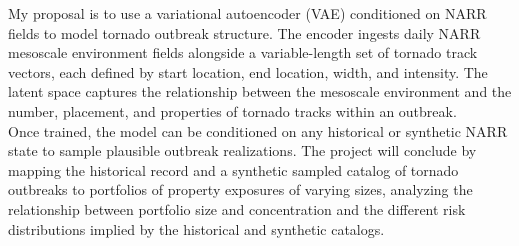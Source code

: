 \documentclass{article}
\begin{document}
My proposal is to use a variational autoencoder (VAE) conditioned on NARR fields to model tornado outbreak structure. The encoder ingests daily NARR mesoscale environment fields alongside a variable-length set of tornado track vectors, each defined by start location, end location, width, and intensity. The latent space captures
  the relationship between the mesoscale environment and the number, placement, and properties of tornado tracks within an outbreak. \\
  
  Once trained, the model can
  be conditioned on any historical or synthetic NARR state to sample plausible outbreak realizations. The project will conclude by mapping the historical record and a synthetic sampled catalog of tornado outbreaks to portfolios of property exposures of varying sizes, analyzing the relationship between portfolio size and concentration and the different risk distributions implied by the historical and synthetic catalogs.




\newpage
\printbibliography
\end{document}
